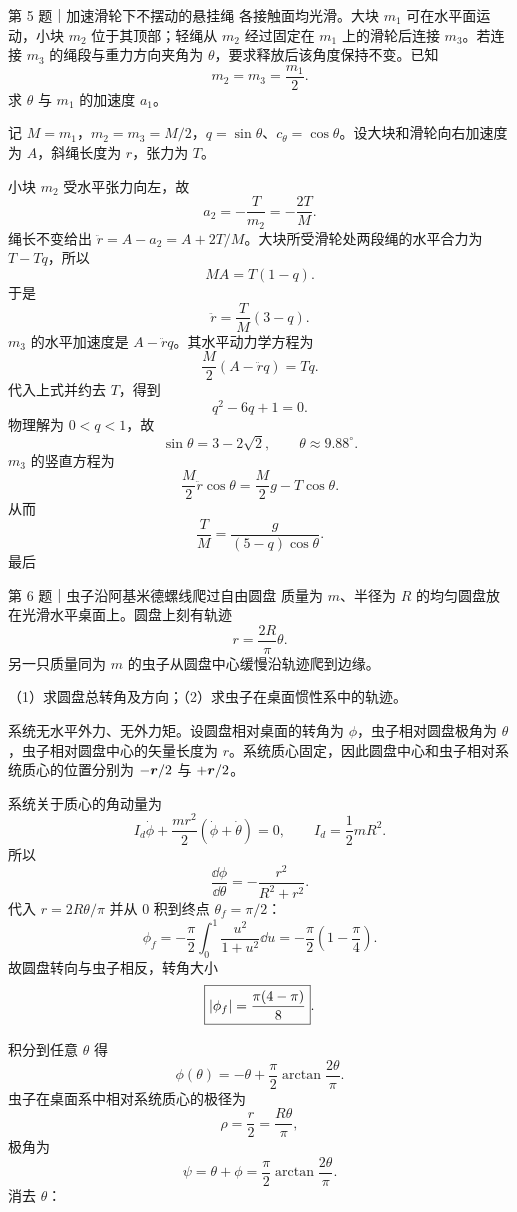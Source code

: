 \begin{problem}{第 5 题｜加速滑轮下不摆动的悬挂绳}
各接触面均光滑。大块 $m_1$ 可在水平面运动，小块 $m_2$ 位于其顶部；轻绳从 $m_2$ 经过固定在 $m_1$ 上的滑轮后连接 $m_3$。若连接 $m_3$ 的绳段与重力方向夹角为 $\theta$，要求释放后该角度保持不变。已知
\[
m_2=m_3=\frac{m_1}{2}.
\]
求 $\theta$ 与 $m_1$ 的加速度 $a_1$。
\FigThreeMass
\end{problem}
\begin{solution}
记 $M=m_1$，$m_2=m_3=M/2$，$q=\sin\theta$、$c_\theta=\cos\theta$。设大块和滑轮向右加速度为 $A$，斜绳长度为 $r$，张力为 $T$。

小块 $m_2$ 受水平张力向左，故
\[
a_2=-\frac{T}{m_2}=-\frac{2T}{M}.
\]
绳长不变给出 $\ddot r=A-a_2=A+2T/M$。大块所受滑轮处两段绳的水平合力为 $T-Tq$，所以
\[
MA=T(1-q).
\]
于是
\[
\ddot r=\frac{T}{M}(3-q).
\]
$m_3$ 的水平加速度是 $A-\ddot r q$。其水平动力学方程为
\[
\frac M2(A-\ddot r q)=Tq.
\]
代入上式并约去 $T$，得到
\[
q^2-6q+1=0.
\]
物理解为 $0<q<1$，故
\[
\boxed{\sin\theta=3-2\sqrt2},
\qquad
\theta\approx9.88^\circ.
\]
$m_3$ 的竖直方程为
\[
\frac M2\ddot r\cos\theta=\frac M2g-T\cos\theta.
\]
从而
\[
\frac TM=\frac{g}{(5-q)\cos\theta}.
\]
最后
\end{solution}

\begin{problem}{第 6 题｜虫子沿阿基米德螺线爬过自由圆盘}
质量为 $m$、半径为 $R$ 的均匀圆盘放在光滑水平桌面上。圆盘上刻有轨迹
\[
r=\frac{2R}{\pi}\theta.
\]
另一只质量同为 $m$ 的虫子从圆盘中心缓慢沿轨迹爬到边缘。

（1）求圆盘总转角及方向；（2）求虫子在桌面惯性系中的轨迹。
\FigBugDisk
\end{problem}
\begin{solution}
系统无水平外力、无外力矩。设圆盘相对桌面的转角为 $\phi$，虫子相对圆盘极角为 $\theta$，虫子相对圆盘中心的矢量长度为 $r$。系统质心固定，因此圆盘中心和虫子相对系统质心的位置分别为 $-\bm{r}/2$ 与 $+\bm{r}/2$。

系统关于质心的角动量为
\[
I_d\dot\phi+\frac{mr^2}{2}(\dot\phi+\dot\theta)=0,
\qquad I_d=\frac12mR^2.
\]
所以
\[
\frac{\dd\phi}{\dd\theta}=-\frac{r^2}{R^2+r^2}.
\]
代入 $r=2R\theta/\pi$ 并从 $0$ 积到终点 $\theta_f=\pi/2$：
\[
\phi_f=-\frac\pi2\int_0^1\frac{u^2}{1+u^2}\dd u
=-\frac\pi2\left(1-\frac\pi4\right).
\]
故圆盘转向与虫子相反，转角大小
\[
\boxed{\left|\phi_f\right|=\frac{\pi(4-\pi)}8}.
\]

积分到任意 $\theta$ 得
\[
\phi(\theta)=-\theta+\frac\pi2\arctan\frac{2\theta}{\pi}.
\]
虫子在桌面系中相对系统质心的极径为
\[
\rho=\frac r2=\frac{R\theta}{\pi},
\]
极角为
\[
\psi=\theta+\phi=\frac\pi2\arctan\frac{2\theta}{\pi}.
\]
消去 $\theta$：
\end{solution}

